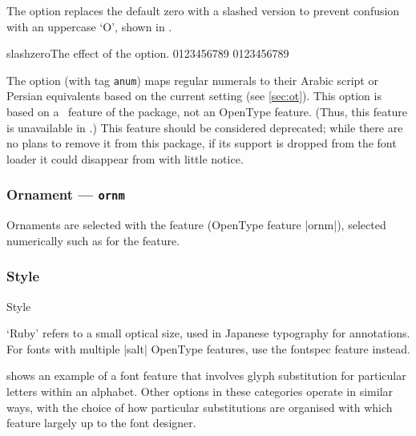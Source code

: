 \documentclass[a4paper]{l3doc}
\begin{document}
The  option
replaces the default zero with a slashed version to prevent
confusion with an uppercase `O', shown in .

\begin{Lexample}{slashzero}{The effect of the  option.}
   0123456789
   0123456789
\end{Lexample}

The  option (with tag \verb|anum|) maps regular numerals to their Arabic script or Persian equivalents
based on the current  setting (see \vref{sec:ot}).
This option is based on a \LuaTeX\ feature of the  package,
not an OpenType feature. (Thus, this feature is unavailable in \XeTeX.)
This feature should be considered deprecated; while there are no plans to remove it from this package,
if its support is dropped from the font loader it could disappear from  with little notice.


\subsubsection{Ornament --- \texttt{ornm}}

Ornaments are selected with the  feature (OpenType feature |ornm|),
selected numerically such as for the  feature.


\subsubsection{Style}
\label{sec:ot-feat-style}

\begin{features}{Style}
\end{features}

`Ruby' refers to a small optical size, used in
Japanese typography for annotations.
For fonts with multiple |salt| OpenType features,
use the fontspec  feature instead.

 shows an example of a font feature that involves glyph substitution
for particular letters within an alphabet.
Other options in these categories operate in similar ways, with the choice of how
particular substitutions are organised with which feature largely up to the font designer.
\end{document}
